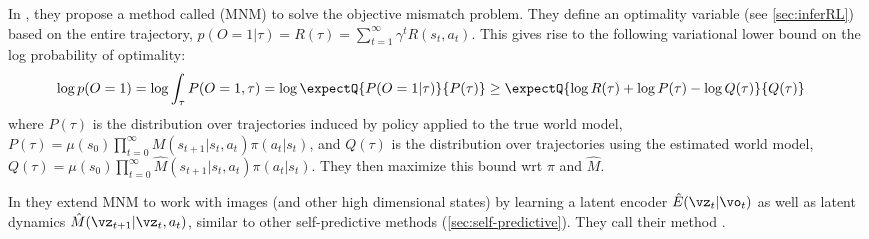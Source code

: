 In \citep{Eysenbach2022}, they propose a method called
 (MNM) to solve the objective mismatch problem.
They define an optimality variable (see \cref{sec:inferRL})
based on the entire trajectory,
$p(O=1|\tau) = R(\tau) = \sum_{t=1}^{\infty} \gamma^t R(s_t,a_t)$.
This gives rise to the following variational lower bound
on the log probability of optimality:
\begin{eqnarray*}
  \log p(O=1) &= \log \int_{\tau} P(O=1,\tau)
  = \log \expectQ{P(O=1|\tau)}{P(\tau)}
  \geq \expectQ{\log R(\tau) + \log P(\tau) - \log Q(\tau)}{Q(\tau)}
\end{eqnarray*}
where $P(\tau)$ is the distribution over trajectories induced by policy
applied to the true world model,
  $P(\tau) = \mu(s_0) \prod_{t=0}^{\infty} M(s_{t+1}|s_t,a_t)  \pi(a_t|s_t)$,
and $Q(\tau)$ is the distribution over trajectories
using the estimated world model,
  $Q(\tau) = \mu(s_0) \prod_{t=0}^{\infty} \hat{M}(s_{t+1}|s_t,a_t)
  \pi(a_t|s_t)$.
They then maximize this bound wrt $\pi$ and $\hat{M}$.


In \citep{Ghugare2022}
they extend MNM to work with images (and other high dimensional states)
by learning a latent encoder $\hat{E}(\vz_t|\vo_t)$
as well as latent dynamics $\hat{M}(\vz_{t+1}|\vz_t,a_t)$,
similar to other self-predictive methods
(\cref{sec:self-predictive}).
They call their method
.




